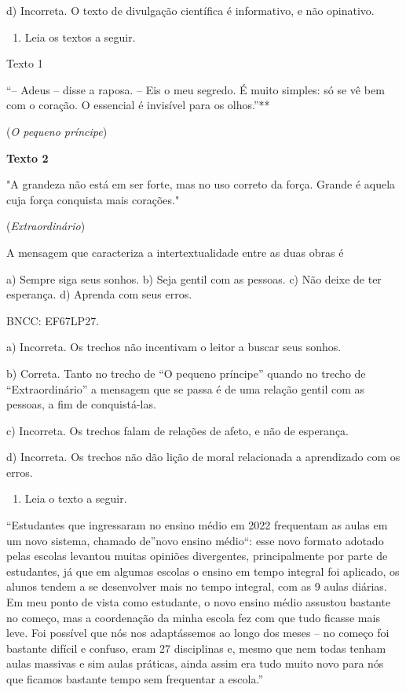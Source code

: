 d) Incorreta. O texto de divulgação científica é informativo, e não
opinativo.

\begin{enumerate}
\def\labelenumi{\arabic{enumi}.}
\setcounter{enumi}{8}
\tightlist
\item
  Leia os textos a seguir.
\end{enumerate}

Texto 1

``-- Adeus -- disse a raposa. -- Eis o meu segredo. É muito simples: só
se vê bem com o coração. O essencial é invisível para os olhos.''**

(\emph{O pequeno príncipe})

\textbf{Texto 2}

"A grandeza não está em ser forte, mas no uso correto da força. Grande é
aquela cuja força conquista mais corações."

(\emph{Extraordinário})

A mensagem que caracteriza a intertextualidade entre as duas obras é

a) Sempre siga seus sonhos. b) Seja gentil com as pessoas. c) Não deixe
de ter esperança. d) Aprenda com seus erros.

BNCC: EF67LP27.

a) Incorreta. Os trechos não incentivam o leitor a buscar seus sonhos.

b) Correta. Tanto no trecho de ``O pequeno príncipe'' quando no trecho
de ``Extraordinário'' a mensagem que se passa é de uma relação gentil
com as pessoas, a fim de conquistá-las.

c) Incorreta. Os trechos falam de relações de afeto, e não de esperança.

d) Incorreta. Os trechos não dão lição de moral relacionada a
aprendizado com os erros.

\begin{enumerate}
\def\labelenumi{\arabic{enumi}.}
\setcounter{enumi}{9}
\tightlist
\item
  Leia o texto a seguir.
\end{enumerate}

``Estudantes que ingressaram no ensino médio em 2022 frequentam as aulas
em um novo sistema, chamado de''novo ensino médio``: esse novo formato
adotado pelas escolas levantou muitas opiniões divergentes,
principalmente por parte de estudantes, já que em algumas escolas o
ensino em tempo integral foi aplicado, os alunos tendem a se desenvolver
mais no tempo integral, com as 9 aulas diárias. Em meu ponto de vista
como estudante, o novo ensino médio assustou bastante no começo, mas a
coordenação da minha escola fez com que tudo ficasse mais leve. Foi
possível que nós nos adaptássemos ao longo dos meses -- no começo foi
bastante difícil e confuso, eram 27 disciplinas e, mesmo que nem todas
tenham aulas massivas e sim aulas práticas, ainda assim era tudo muito
novo para nós que ficamos bastante tempo sem frequentar a escola.''

